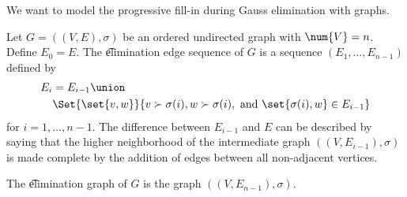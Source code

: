 

We want to model the progressive fill-in during Gauss elimination with graphs.


Let $G = ((V, E), \sigma)$ be an ordered undirected graph with $\num{V} = n$.
Define $E_0 = E$.
The \t{elimination edge sequence} of $G$ is a sequence $(E_1, \dots, E_{n-1})$ defined by
\[
  \begin{aligned}
  E_i & = E_{i-1} \union \\ &\Set{\set{v, w}}{v \succ \sigma(i), w \succ \sigma(i), \text{ and } \set{\sigma(i), w} \in E_{i-1}}
  \end{aligned}
\]
for $i = 1, \dots, n-1$.
The difference between $E_{i-1}$ and $E$ can be described by saying that the higher neighborhood of the intermediate graph $((V, E_{i-1}), \sigma)$ is made complete by the addition of edges between all non-adjacent vertices.

The \t{elimination graph} of $G$ is the graph $((V, E_{n-1}), \sigma)$.


\blankpage
